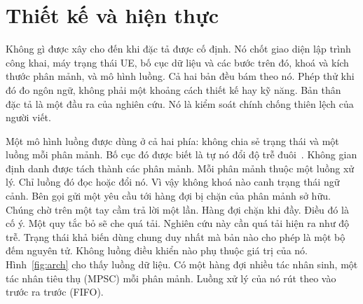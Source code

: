 \chapter{Thiết kế và hiện thực\label{chapter:design}}

Không gì được xây cho đến khi đặc tả được cố định. Nó chốt giao diện lập trình công khai, máy
trạng thái UE, bố cục dữ liệu và các bước trên đó, khoá và kích thước phân mảnh, và mô hình
luồng. Cả hai bản đều bám theo nó. Phép thử khi đó đo ngôn ngữ, không phải một khoảng cách thiết
kế hay kỹ năng. Bản thân đặc tả là một đầu ra của nghiên cứu. Nó là kiểm soát chính chống thiên
lệch của người viết.

Một mô hình luồng được dùng ở cả hai phía: không chia sẻ trạng thái và một luồng mỗi phân mảnh.
Bố cục đó được biết là tự nó đổi độ trễ đuôi~\cite{enberg2019threadpercore}. Không gian định
danh được tách thành các phân mảnh. Mỗi phân mảnh thuộc một luồng xử lý. Chỉ luồng đó đọc hoặc
đổi nó. Vì vậy không khoá nào canh trạng thái ngữ cảnh. Bên gọi gửi một yêu cầu tới hàng đợi bị
chặn của phân mảnh sở hữu. Chúng chờ trên một tay cầm trả lời một lần. Hàng đợi chặn khi đầy.
Điều đó là cố ý. Một quy tắc bỏ sẽ che quá tải. Nghiên cứu này cần quá tải hiện ra như độ trễ.
Trạng thái khả biến dùng chung duy nhất mà bản nào cho phép là một bộ đếm nguyên tử. Không luồng
điều khiển nào phụ thuộc giá trị của nó. Hình~\ref{fig:arch} cho thấy luồng dữ liệu. Có một hàng
đợi nhiều tác nhân sinh, một tác nhân tiêu thụ (MPSC) mỗi phân mảnh. Luồng xử lý của nó rút theo
vào trước ra trước (FIFO).

